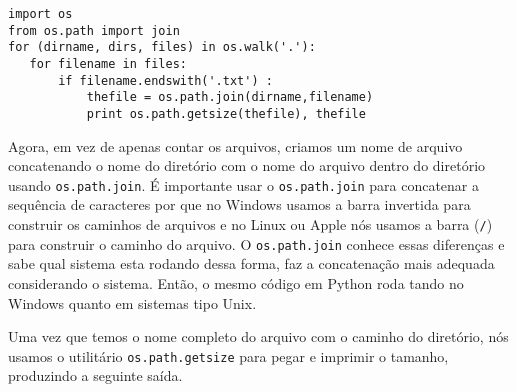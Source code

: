 \beforeverb
\begin{verbatim}
import os
from os.path import join
for (dirname, dirs, files) in os.walk('.'):
   for filename in files:
       if filename.endswith('.txt') :
           thefile = os.path.join(dirname,filename)
           print os.path.getsize(thefile), thefile
\end{verbatim}
\afterverb

Agora, em vez de apenas contar os arquivos, criamos um nome de arquivo concatenando o nome do diretório com
o nome do arquivo dentro do diretório usando {\tt os.path.join}.
É importante usar o {\tt os.path.join} para concatenar a sequência de caracteres por que no Windows usamos a
barra invertida para construir os caminhos de arquivos e no Linux ou Apple nós usamos a barra (\verb"/") para construir o caminho do arquivo.
O {\tt os.path.join} conhece essas diferenças e sabe qual sistema esta rodando dessa forma, faz a concatenação mais adequada considerando o sistema. Então, o mesmo código em Python roda tando no Windows quanto em sistemas tipo Unix.

Uma vez que temos o nome completo do arquivo com o caminho do diretório, nós usamos o utilitário {\tt os.path.getsize} para pegar e imprimir o tamanho, produzindo a seguinte saída.  

